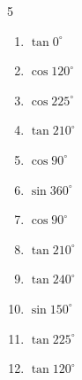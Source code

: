 \begin{multicols}{5}
\begin{enumerate}
        \phantom{$\displaystyle =1$}

  \item $\displaystyle \tan{0^\circ}$

        \phantom{$\displaystyle =0$}

  \item $\displaystyle \cos{120^\circ}$


  \item $\displaystyle \cos{225^\circ}$


  \item $\displaystyle \tan{210^\circ}$


  \item $\displaystyle \cos{90^\circ}$

        \phantom{$\displaystyle =0$}

  \item $\displaystyle \sin{360^\circ}$

        \phantom{$\displaystyle =0$}

  \item $\displaystyle \cos{90^\circ}$

        \phantom{$\displaystyle =0$}

  \item $\displaystyle \tan{210^\circ}$


  \item $\displaystyle \tan{240^\circ}$


  \item $\displaystyle \sin{150^\circ}$


  \item $\displaystyle \tan{225^\circ}$

        \phantom{$\displaystyle =1$}

\columnbreak %

  \item $\displaystyle \tan{120^\circ}$



\end{enumerate}
\end{multicols}

